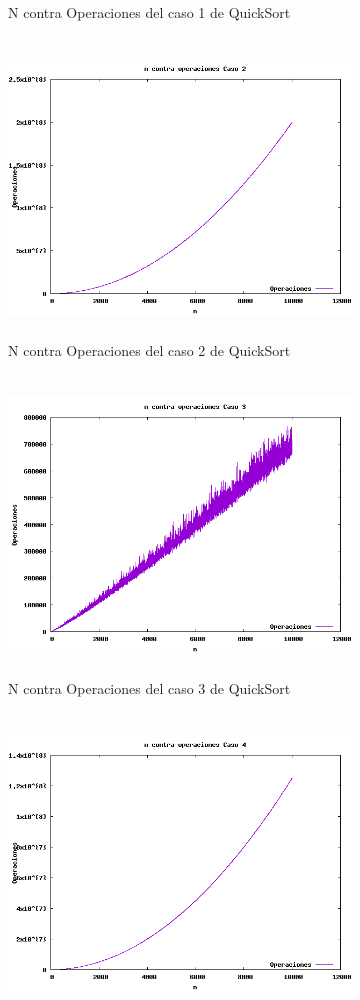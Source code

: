 \documentclass[spanish]{article}
\begin{document}
\begin{figure}[h!]
\begin{figure}[H]
		\caption{N contra Operaciones del caso 1 de QuickSort}
	\end{figure}	
	\begin{figure}[H]
		\centering
		\includegraphics[width=400px,height=300px]{grafica4}
		\caption{N contra Operaciones del caso 2 de QuickSort}
	\end{figure}	
	\begin{figure}[H]
		\centering
		\includegraphics[width=400px,height=300px]{grafica5}
		\caption{N contra Operaciones del caso 3 de QuickSort}
	\end{figure}	
	\begin{figure}[H]
		\centering
		\includegraphics[width=400px,height=300px]{grafica6}

\end{figure}
\end{figure}
\end{document}
